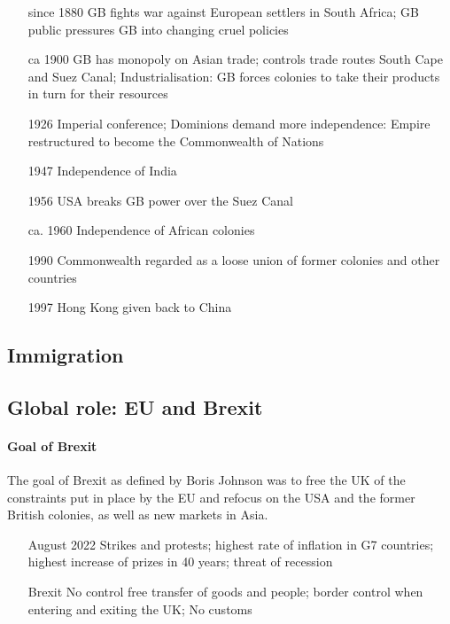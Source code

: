 \documentclass[10pt]{article}
\begin{document}
\begin{itemize}[leftmargin=5pt+]
\item[since 1880] GB fights war against European settlers in South Africa; GB public pressures GB into changing cruel policies
\item[ca 1900] GB has monopoly on Asian trade; controls trade routes South Cape and Suez Canal; Industrialisation: GB forces colonies to take their products in turn for their resources
\item[1926] Imperial conference; Dominions demand more independence: Empire restructured to become the Commonwealth of Nations 
\item[1947] Independence of India
\item[1956] USA breaks GB power over the Suez Canal
\item[ca. 1960] Independence of African colonies
\item[1990] Commonwealth regarded as a loose union of former colonies and other countries
\item[1997] Hong Kong given back to China 
\end{itemize}
\subsection{Immigration}
	\label{ssec:uk@immig}
\subsection{Global role: EU and Brexit}
	\label{ssec:uk@brexit}
	\setcounter{sidenote}{1}
\paragraph{Goal of Brexit}
The goal of Brexit as defined by Boris Johnson was to free the UK of the constraints
put in place by the EU and refocus on the USA and the former British colonies, as well as
new markets in Asia.

\begin{itemize}[leftmargin=5pt+]
\item [August 2022] Strikes and protests; highest rate of inflation in G7 countries;
highest increase of prizes in 40 years; threat of recession 
\item [Brexit] No control free transfer of goods and people; border control when entering and exiting the UK; No customs 
\end{itemize}
\end{document}
